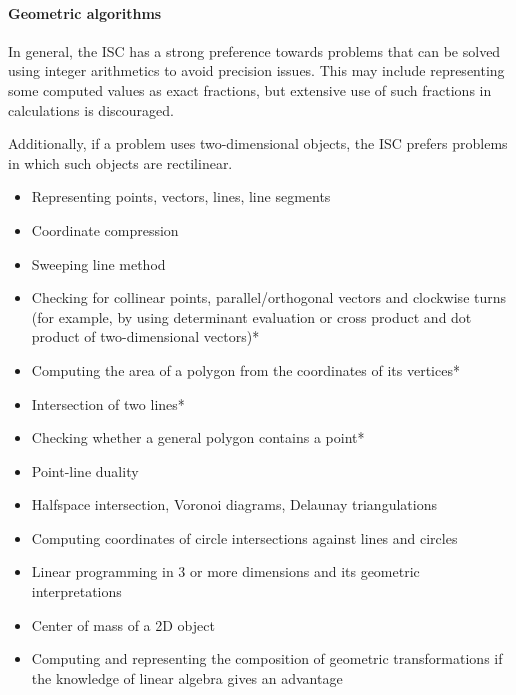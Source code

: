 \documentclass[12pt]{article}
\begin{document}
		\paragraph{Geometric algorithms}
		In general, the ISC has a strong preference towards problems that can be solved using integer arithmetics to avoid precision issues. This may include representing some computed values as exact fractions, but extensive use of such fractions in calculations is discouraged.
		
		Additionally, if a problem uses two-dimensional objects, the ISC prefers problems in which such objects are rectilinear.
		
		\begin{itemize}[label=]
			\item Representing points, vectors, lines, line segments
			\item Coordinate compression
			\item Sweeping line method
		\end{itemize}
	
		\begin{itemize}[label=]
			\item Checking for collinear points, parallel/orthogonal vectors and clockwise turns (for example, by using determinant evaluation or cross product and dot product of two-dimensional vectors)*
			\item Computing the area of a polygon from the coordinates of its vertices*
			\item Intersection of two lines*
			\item Checking whether a general polygon contains a point*
			\item Point-line duality
			\item Halfspace intersection, Voronoi diagrams, Delaunay triangulations
			\item Computing coordinates of circle intersections against lines and circles
			\item Linear programming in $3$ or more dimensions and its geometric interpretations
			\item Center of mass of a 2D object
			\item Computing and representing the composition of geometric transformations if the knowledge of linear algebra gives an advantage
		\end{itemize}
		
\end{document}
